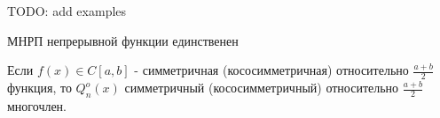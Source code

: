 \begin{ticket}
  \begin{example}
    TODO: add examples    
  \end{example}
  \begin{theorem}
    МНРП непрерывной функции единственен
  \end{theorem}
  \begin{corollary}
    Если $f(x)\in C[a,b]$ - симметричная (кососимметричная) относительно $\frac{a+b}{2}$ функция, то
    $Q_n^o(x)$ симметричный (кососимметричный) относительно $\frac{a+b}{2}$ многочлен.
  \end{corollary}
\end{ticket}
